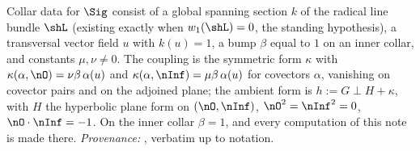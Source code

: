 Collar data for $\Sig$ consist of a global spanning section $k$ of the radical line bundle $\shL$ (existing exactly when $w_1(\shL) = 0$, the standing hypothesis), a transversal vector field $u$ with $k(u) = 1$, a bump $\beta$ equal to $1$ on an inner collar, and constants $\mu, \nu \neq 0$. The coupling is the symmetric form $\kappa$ with $\kappa(\alpha, \nO) = \nu\beta\,\alpha(u)$ and $\kappa(\alpha, \nInf) = \mu\beta\,\alpha(u)$ for covectors $\alpha$, vanishing on covector pairs and on the adjoined plane; the ambient form is $h := G \perp H + \kappa$, with $H$ the hyperbolic plane form on $(\nO, \nInf)$, $\nO^2 = \nInf^2 = 0$, $\nO \cdot \nInf = -1$. On the inner collar $\beta = 1$, and every computation of this note is made there. \emph{Provenance:} \cite[Def.~4.1]{ButlerT4}, verbatim up to notation.
